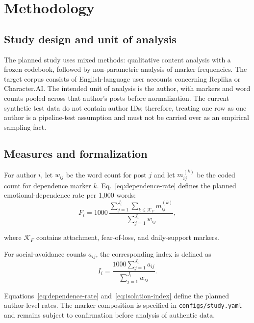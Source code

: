 \section{Methodology}
\label{sec:methodology}

\subsection{Study design and unit of analysis}
\label{subsec:design}

The planned study uses mixed methods: qualitative content analysis with a
frozen codebook, followed by non-parametric analysis of marker frequencies.
The target corpus consists of English-language user accounts concerning
Replika or Character.AI. The intended unit of analysis is the author, with
markers and word counts pooled across that author's posts before
normalization. The current synthetic test data do not contain author IDs;
therefore, treating one row as one author is a pipeline-test assumption and
must not be carried over as an empirical sampling fact.

\subsection{Measures and formalization}
\label{subsec:measures}

For author $i$, let $w_{ij}$ be the word count for post $j$ and let
$m_{ij}^{(k)}$ be the coded count for dependence marker $k$. Eq.~\eqref{eq:dependence-rate} defines the planned
emotional-dependence rate per 1,000 words:
\begin{equation}
  F_i = 1000\,
  \frac{\displaystyle\sum_{j=1}^{J_i}\sum_{k\in\mathcal{K}_F}m_{ij}^{(k)}}
       {\displaystyle\sum_{j=1}^{J_i}w_{ij}},
  \label{eq:dependence-rate}
\end{equation}

where $\mathcal{K}_F$ contains attachment,
fear-of-loss, and daily-support markers.

For social-avoidance counts $a_{ij}$,
the corresponding index is defined as
\begin{equation}
I_i =
\frac{1000\sum_{j=1}^{J_i} a_{ij}}
{\sum_{j=1}^{J_i} w_{ij}}.
\label{eq:isolation-index}
\end{equation}

Equations~\eqref{eq:dependence-rate}
and~\eqref{eq:isolation-index} define the
planned author-level rates. The marker
composition is specified in
\texttt{configs/study.yaml} and remains
subject to confirmation before analysis
of authentic data.

